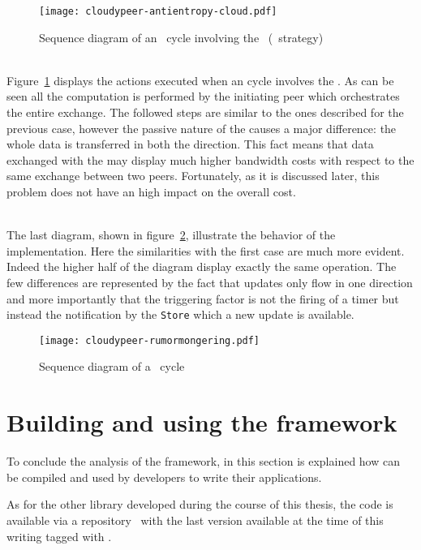 \begin{figure}[h]
  \centering
  \texttt{[image: cloudypeer-antientropy-cloud.pdf]}
  \caption{Sequence diagram of an \antientropy\ cycle involving the
    \cloud\ (\PUSHPULL\ strategy)}
  \label{fig:cloudypeer-sequence-antientropy-cloud}
\end{figure}

\ \\
\noindent Figure~\ref{fig:cloudypeer-sequence-antientropy-cloud} displays the
actions executed when an \antientropy cycle involves the \cloud. As
can be seen all the computation is performed by the initiating peer
which orchestrates the entire exchange. The followed steps are similar
to the ones described for the previous case, however the passive
nature of the \cloud causes a major difference: the whole data is
transferred in both the direction. This fact means that data exchanged
with the \cloud may display much higher bandwidth costs with respect
to the same exchange between two peers. Fortunately, as it is
discussed later, this problem does not have an high impact on the
overall cost.

\ \\
\noindent The last diagram, shown in
figure~\ref{fig:cloudypeer-sequence-rumormongering}, illustrate the
behavior of the \rumormongering implementation. Here the similarities
with the first case are much more evident. Indeed the higher half of the
diagram display exactly the same operation. The few differences are
represented by the fact that updates only flow in one direction and
more importantly that the triggering factor is not the firing of a
timer but instead the notification by the \texttt{Store} which a new
update is available.

\begin{figure}[H]
  \centering
  \texttt{[image: cloudypeer-rumormongering.pdf]}
  \caption{Sequence diagram of a \rumormongering\ cycle}
  \label{fig:cloudypeer-sequence-rumormongering}
\end{figure}

\clearpage
\section{Building and using the framework}
To conclude the analysis of the framework, in this section is
explained how \cloudypeer can be compiled and used by developers to
write their \ptop applications.

As for the other library developed during the course of this thesis,
the code is available via a \github repository~\cite{cloudypeer-repo}
with the last version available at the time of this writing tagged
with \thesistag.

